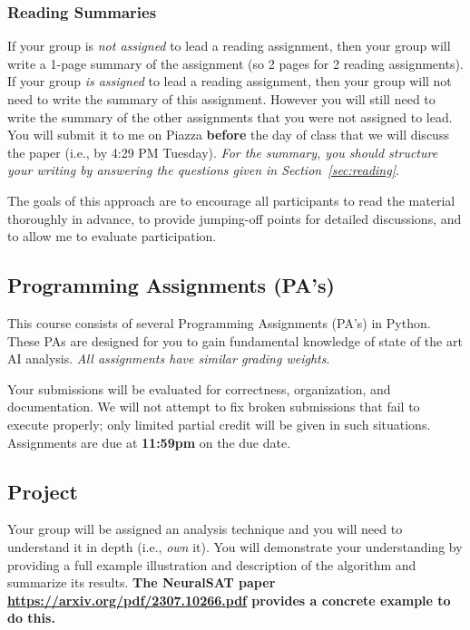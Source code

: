 \documentclass[11pt]{article}
\begin{document}
\subsubsection{Reading Summaries} 

If your group is \emph{not assigned} to lead a reading assignment, then your group will write a 1-page summary of the assignment (so 2 pages for 2 reading assignments). 
If your group \emph{is assigned} to lead a reading assignment, then your group will not need to write the summary of this assignment. However you will still need to write the summary of the other assignments that you were not assigned to lead.
You will submit it to me on Piazza \textbf{before} the day of class that we will discuss the paper (i.e., by 4:29 PM Tuesday).  \emph{For the summary, you should structure your writing by answering the questions given in Section~\ref{sec:reading}}.

The goals of this approach are to encourage all participants to read the material thoroughly in advance, to provide jumping-off points for detailed discussions, and to allow me to evaluate participation.

\subsection{Programming Assignments (PA's)}

This course consists of several Programming Assignments (PA's) in Python. These PAs are designed for you to gain fundamental knowledge of state of the art AI analysis. \emph{All assignments have similar grading weights}.

Your submissions will be evaluated for correctness,
organization, and documentation. We will not attempt to fix broken
submissions that fail to execute properly; only limited partial credit will be given in such situations. Assignments are due at \textbf{11:59pm} on the due date.

    

\subsection{Project}
\label{sec:org6da900e}

Your group will be assigned an analysis technique and you will need to understand it in depth (i.e., \emph{own} it). You will demonstrate your understanding by providing a full example illustration and description of the algorithm and summarize its results.  \textbf{The NeuralSAT paper \url{https://arxiv.org/pdf/2307.10266.pdf} provides a concrete example to do this.}
\end{document}
